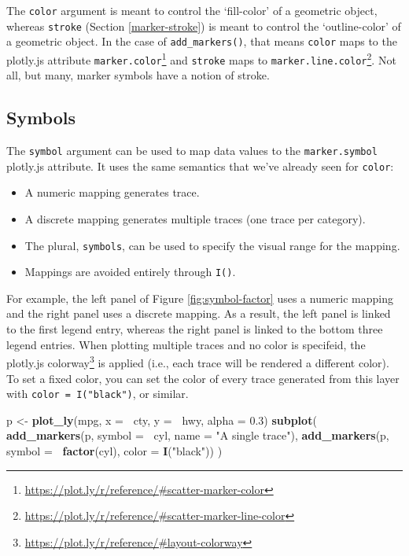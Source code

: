 \documentclass[
  12pt,
]{krantz}
\newenvironment{Shaded}{\begin{snugshade}}{\end{snugshade}}
\newcommand{\DataTypeTok}[1]{\textcolor[rgb]{0.13,0.29,0.53}{#1}}
\newcommand{\FloatTok}[1]{\textcolor[rgb]{0.00,0.00,0.81}{#1}}
\newcommand{\KeywordTok}[1]{\textcolor[rgb]{0.13,0.29,0.53}{\textbf{#1}}}
\newcommand{\NormalTok}[1]{#1}
\newcommand{\OperatorTok}[1]{\textcolor[rgb]{0.81,0.36,0.00}{\textbf{#1}}}
\newcommand{\StringTok}[1]{\textcolor[rgb]{0.31,0.60,0.02}{#1}}
\providecommand{\tightlist}{%
  \setlength{\itemsep}{0pt}\setlength{\parskip}{0pt}}
\renewcommand{\href}[2]{#2\footnote{\url{#1}}}
\begin{document}
The \texttt{color} argument is meant to control the `fill-color' of a geometric object, whereas \texttt{stroke} (Section \ref{marker-stroke}) is meant to control the `outline-color' of a geometric object. In the case of \texttt{add\_markers()}, that means \texttt{color} maps to the plotly.js attribute \href{https://plot.ly/r/reference/\#scatter-marker-color}{\texttt{marker.color}} and \texttt{stroke} maps to \href{https://plot.ly/r/reference/\#scatter-marker-line-color}{\texttt{marker.line.color}}. Not all, but many, marker symbols have a notion of stroke.

\hypertarget{marker-symbol}{%
\subsection{Symbols}\label{marker-symbol}}

The \texttt{symbol} argument can be used to map data values to the \texttt{marker.symbol} plotly.js attribute. It uses the same semantics that we've already seen for \texttt{color}:

\begin{itemize}
\tightlist
\item
  A numeric mapping generates trace.
\item
  A discrete mapping generates multiple traces (one trace per category).
\item
  The plural, \texttt{symbols}, can be used to specify the visual range for the mapping.
\item
  Mappings are avoided entirely through \texttt{I()}.
\end{itemize}

For example, the left panel of Figure \ref{fig:symbol-factor} uses a numeric mapping and the right panel uses a discrete mapping. As a result, the left panel is linked to the first legend entry, whereas the right panel is linked to the bottom three legend entries. When plotting multiple traces and no color is specifeid, the plotly.js \href{https://plot.ly/r/reference/\#layout-colorway}{colorway} is applied (i.e., each trace will be rendered a different color). To set a fixed color, you can set the color of every trace generated from this layer with \texttt{color\ =\ I("black")}, or similar.

\begin{Shaded}
\begin{Highlighting}[]
\NormalTok{p <-}\StringTok{ }\KeywordTok{plot_ly}\NormalTok{(mpg, }\DataTypeTok{x =} \OperatorTok{~}\NormalTok{cty, }\DataTypeTok{y =} \OperatorTok{~}\NormalTok{hwy, }\DataTypeTok{alpha =} \FloatTok{0.3}\NormalTok{) }
\KeywordTok{subplot}\NormalTok{(}
  \KeywordTok{add_markers}\NormalTok{(p, }\DataTypeTok{symbol =} \OperatorTok{~}\NormalTok{cyl, }\DataTypeTok{name =} \StringTok{"A single trace"}\NormalTok{),}
  \KeywordTok{add_markers}\NormalTok{(p, }\DataTypeTok{symbol =} \OperatorTok{~}\KeywordTok{factor}\NormalTok{(cyl), }\DataTypeTok{color =} \KeywordTok{I}\NormalTok{(}\StringTok{"black"}\NormalTok{))}
\NormalTok{)}
\end{Highlighting}
\end{Shaded}
\end{document}
